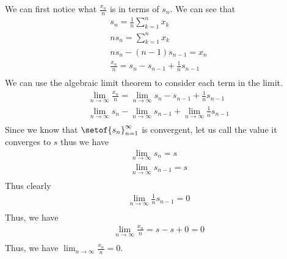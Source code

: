 \documentclass[answers,12pt,addpoints]{exam}
\begin{document}
\begin{questions}
\begin{solution}
            We can first notice what $\frac{x_n}{n}$ is in terms of $s_n$. We can see that
            \begin{align*}
                s_n = \frac{1}{n} \sum_{k=1}^{n} x_k\\
                n s_n = \sum_{k=1}^{n} x_k\\
                n s_n - (n-1)s_{n-1} = x_n\\
                \frac{x_n}{n} = s_n - s_{n-1} + \frac{1}{n}s_{n-1}\\
            \end{align*}
            We can use the algebraic limit theorem to consider each term in the limit. \begin{align*}
                \lim_{n \to \infty} \frac{x_n}{n} = \lim_{n \to \infty} s_n - s_{n-1} + \frac{1}{n} s_{n-1}\\
                \lim_{n \to \infty} s_n - \lim_{n \to \infty} s_{n-1} + \lim_{n \to \infty} \frac{1}{n}s_{n-1}\\
            \end{align*}
            Since we know that $\setof{s_n}_{n=1}^{\infty}$ is convergent, let us call the value it converges to $s$ thus we have
            \begin{align*}
                \lim_{n \to \infty} s_n = s\\
                \lim_{n \to \infty} s_{n-1} = s\\
            \end{align*}
            Thus clearly 
            \begin{align*}
                \lim_{n \to \infty} \frac{1}{n} s_{n-1} = 0\\
            \end{align*}
            Thus, we have
            \begin{align*}
                \lim_{n \to \infty} \frac{x_n}{n} = s - s + 0 = 0\\
            \end{align*}
            Thus, we have $\lim_{n \to \infty} \frac{x_n}{n} = 0$.
        \end{solution}
\end{questions}
\end{document}
